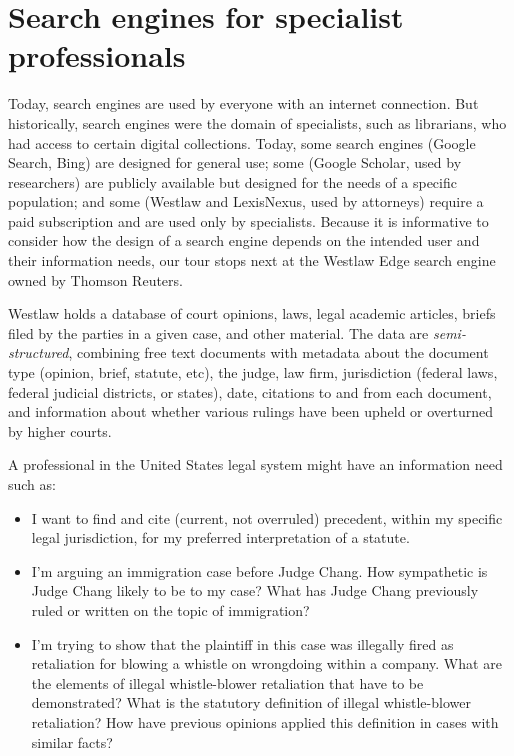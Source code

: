 \section{Search engines for specialist professionals}
\label{sec:search-engine-indexing}

Today, search engines are used by everyone with an internet connection.  But historically, search engines were the domain of specialists, such as librarians, who had access to certain digital  collections.  Today, some search engines (Google Search, Bing) are designed for general use; some (Google Scholar, used by  researchers) are publicly available but designed for the  needs of a specific population; and some  (Westlaw and LexisNexus, used by attorneys) require a paid subscription and are used only by specialists.   Because it is informative to consider how the design of a search engine depends on the intended user and their information needs,  our tour stops next at the Westlaw Edge search engine owned by Thomson Reuters.  

Westlaw holds a database of court opinions, laws, legal academic articles, briefs filed by the parties in a given case, and other material.  The data are \emph{semi-structured}, combining free text documents with metadata about the document type (opinion, brief, statute, etc), the judge, law firm, jurisdiction (federal laws, federal judicial districts, or states), date, citations to and from each document, and information about whether various rulings have been upheld or overturned by higher courts.

A  professional in the United States legal system might have an information need such as:

\begin{itemize}

\item I want to find and cite (current, not overruled) precedent, within my specific legal jurisdiction, for my preferred interpretation of a statute. 

\item I'm arguing an immigration case before Judge Chang.  How sympathetic is Judge Chang likely to be to my case?  What has Judge Chang previously ruled or written on the topic of immigration?

\item I'm trying to show that the plaintiff in this case was illegally fired as retaliation for blowing a whistle on wrongdoing within a company.  What are the elements of illegal whistle-blower retaliation that have to be demonstrated?  What is the statutory definition of illegal whistle-blower retaliation?  How have previous opinions applied this definition in cases with similar facts?


\end{itemize}

